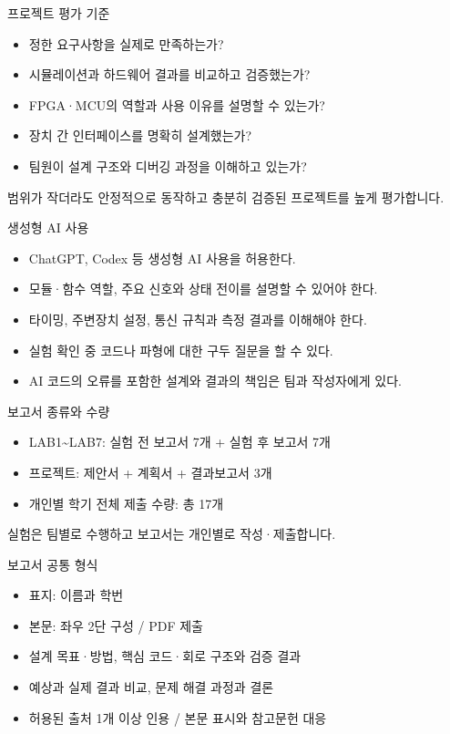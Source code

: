 \documentclass[aspectratio=169,11pt,t]{beamer}
\begin{document}
\begin{frame}{프로젝트 평가 기준}
\begin{itemize}
\item 정한 요구사항을 실제로 만족하는가?
\item 시뮬레이션과 하드웨어 결과를 비교하고 검증했는가?
\item FPGA·MCU의 역할과 사용 이유를 설명할 수 있는가?
\item 장치 간 인터페이스를 명확히 설계했는가?
\item 팀원이 설계 구조와 디버깅 과정을 이해하고 있는가?
\end{itemize}
\vspace{0.35cm}
범위가 작더라도 안정적으로 동작하고 충분히 검증된 프로젝트를 높게 평가합니다.
\end{frame}

\begin{frame}{생성형 AI 사용}
\begin{itemize}
\item ChatGPT, Codex 등 생성형 AI 사용을 허용한다.
\item 모듈·함수 역할, 주요 신호와 상태 전이를 설명할 수 있어야 한다.
\item 타이밍, 주변장치 설정, 통신 규칙과 측정 결과를 이해해야 한다.
\item 실험 확인 중 코드나 파형에 대한 구두 질문을 할 수 있다.
\item AI 코드의 오류를 포함한 설계와 결과의 책임은 팀과 작성자에게 있다.
\end{itemize}
\end{frame}

\begin{frame}{보고서 종류와 수량}
\begin{itemize}
\item LAB1\textasciitilde{}LAB7: 실험 전 보고서 7개 + 실험 후 보고서 7개
\item 프로젝트: 제안서 + 계획서 + 결과보고서 3개
\item 개인별 학기 전체 제출 수량: 총 17개
\end{itemize}
\vspace{0.35cm}
실험은 팀별로 수행하고 보고서는 개인별로 작성·제출합니다.
\end{frame}

\begin{frame}{보고서 공통 형식}
\begin{itemize}
\item 표지: 이름과 학번
\item 본문: 좌우 2단 구성 / PDF 제출
\item 설계 목표·방법, 핵심 코드·회로 구조와 검증 결과
\item 예상과 실제 결과 비교, 문제 해결 과정과 결론
\item 허용된 출처 1개 이상 인용 / 본문 표시와 참고문헌 대응
\end{itemize}
\end{frame}
\end{document}
